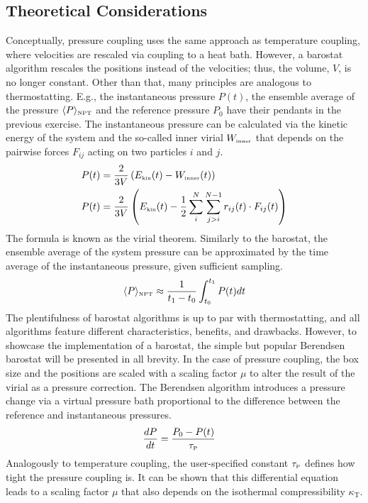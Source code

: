 \documentclass[9pt,tutorial]{livecoms}
\begin{document}
\subsection*{Theoretical Considerations}
Conceptually, pressure coupling uses the same approach as temperature coupling, where velocities are rescaled via coupling to a heat bath. However, a barostat algorithm rescales the positions instead of the velocities; thus, the volume, $V$, is no longer constant. Other than that, many principles are analogous to thermostatting. E.g., the instantaneous pressure $P(t)$, the ensemble average of the pressure $\langle P\rangle_\text{\tiny NPT}$ and the reference pressure $P_0$ have their pendants in the previous exercise. The instantaneous pressure can be calculated via the kinetic energy of the system and the so-called inner virial $W_\text{\tiny inner}$ that depends on the pairwise forces $F_{ij}$ acting on two particles $i$ and $j$.\cite{Clausius1870,Brenig1996}
\begin{align}
    P(t) &= \frac{2}{3V} \left(E_\text{\tiny kin}(t) - W_\text{\tiny inner}(t) \right) \\
    P(t) &= \frac{2}{3V} \left(E_\text{\tiny kin}(t) - \frac{1}{2}\sum_{i}^N\sum_{j>i}^{N-1} r_{ij}(t) \cdot F_{ij}(t)  \right)
\end{align}
The formula is known as the virial theorem. Similarly to the barostat, the ensemble average of the system pressure can be approximated by the time average of the instantaneous pressure, given sufficient sampling.\cite{Coudene2016}
\begin{align}
    \langle P\rangle_\text{\tiny NPT}  \approx \frac{1}{{t_1} - {t_0}}\int_{t_0}^{t_1} P(t) dt
\end{align}
The plentifulness of barostat algorithms is up to par with thermostatting, and all algorithms feature different characteristics, benefits, and drawbacks. However, to showcase the implementation of a barostat, the simple but popular Berendsen barostat will be presented in all brevity. In the case of pressure coupling, the box size and the positions are scaled with a scaling factor $\mu$ to alter the result of the virial as a pressure correction. The Berendsen algorithm introduces a pressure change via a virtual pressure bath proportional to the difference between the reference and instantaneous pressures.\cite{Berendsen1984}
\begin{align}
    \frac{dP}{dt} & = \frac{P_0 - P(t)}{\tau_\text{\tiny P}}
\end{align}
Analogously to temperature coupling, the user-specified constant $\tau_\text{\tiny P}$ defines how tight the pressure coupling is. It can be shown that this differential equation leads to a scaling factor $\mu$ that also depends on the isothermal compressibility $\kappa_\text{T}$.\cite{Berendsen1984}
\end{document}
